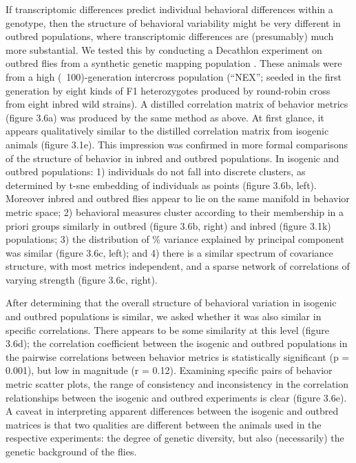 \documentclass[12pt,letterpaper]{article}
\begin{document}
If transcriptomic differences predict individual behavioral differences within a genotype, then the structure of behavioral variability might be very different in outbred populations, where transcriptomic differences are (presumably) much more substantial. We tested this by conducting a Decathlon experiment on outbred flies from a synthetic genetic mapping population \cite{Long_Dissecting_2014}. These animals were from a high (~100)-generation intercross population (“NEX”; seeded in the first generation by eight kinds of F1 heterozygotes produced by round-robin cross from eight inbred wild strains). A distilled correlation matrix of behavior metrics (figure 3.6a) was produced by the same method as above. At first glance, it appears qualitatively similar to the distilled correlation matrix from isogenic animals (figure 3.1e). This impression was confirmed in more formal comparisons of the structure of behavior in inbred and outbred populations. In isogenic and outbred populations: 1) individuals do not fall into discrete clusters, as determined by t-sne embedding of individuals as points (figure 3.6b, left). Moreover inbred and outbred flies appear to lie on the same manifold in behavior metric space; 2) behavioral measures cluster according to their membership in a priori groups similarly in outbred (figure 3.6b, right) and inbred (figure 3.1k) populations; 3) the distribution of \% variance explained by principal component was similar (figure 3.6c, left); and 4) there is a similar spectrum of covariance structure, with most metrics independent, and a sparse network of correlations of varying strength (figure 3.6c, right). 

After determining that the overall structure of behavioral variation in isogenic and outbred populations is similar, we asked whether it was also similar in specific correlations. There appears to be some similarity at this level (figure 3.6d); the correlation coefficient between the isogenic and outbred populations in the pairwise correlations between behavior metrics is statistically significant (p = 0.001), but low in magnitude (r = 0.12). Examining specific pairs of behavior metric scatter plots, the range of consistency and inconsistency in the correlation relationships between the isogenic and outbred experiments is clear (figure 3.6e). A caveat in interpreting apparent differences between the isogenic and outbred matrices is that two qualities are different between the animals used in the respective experiments: the degree of genetic diversity, but also (necessarily) the genetic background of the flies.
\end{document}
